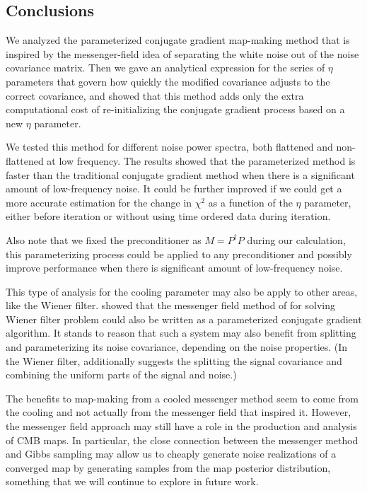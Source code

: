 \documentclass[twocolumn,linenumbers]{aastex631}
\newcommand{\Pdagger}{P^{\dagger}}
\begin{document}
\begin{CJK*}{UTF8}{gbsn}
\section{Conclusions} \label{sec:conclusions} 


We analyzed {the} parameterized conjugate gradient map-making method that is inspired by the messenger-field idea of
separating the white noise out of {the} noise covariance matrix.
Then we gave an analytical expression for the series of $\eta$ parameters that govern how quickly the modified covariance adjusts to the correct covariance,
and showed that this method adds only the extra computational cost of re-initializing the conjugate gradient process based on a new $\eta$ parameter.

We tested this method for different noise power {spectra}, both flattened and non-flattened at low frequency.
The results showed that the parameterized method is faster than the traditional conjugate gradient method 
when there is a significant amount of low-frequency noise.
It could be further improved if we could get a more accurate estimation for the change in $\chi^2$ as a function of the $\eta$ parameter, either before iteration or without using time ordered data during iteration.

Also note that we fixed the preconditioner as $M = \Pdagger P$ during our calculation,
this parameterizing process could be applied to any preconditioner and possibly improve performance when 
there is significant amount of low-frequency noise.

This type of analysis for the cooling parameter may also be apply to other areas, like the Wiener filter.
\citet{2018A&A...620A..59P} showed that the messenger field method of \citet{2013A&A...549A.111E} for solving Wiener filter problem  could also be written as a parameterized conjugate gradient algorithm.
It stands to reason that such a system may also benefit from splitting and parameterizing its noise covariance, depending on the noise properties.
(In the Wiener filter, \citet{2017MNRAS.468.1782K} additionally suggests the splitting the signal covariance and combining the uniform parts of the signal and noise.)

The benefits to map-making from a cooled messenger method seem to come from the cooling and not actually from the messenger field that inspired it.  However, the messenger field approach may still have a role in the production and analysis of CMB maps.  In particular, the close connection between the messenger method and Gibbs sampling may allow us to cheaply generate noise realizations of a converged map by generating samples from the map posterior distribution, something that we will continue to explore in future work.













\end{CJK*}
\end{document}
